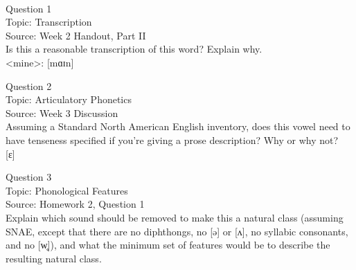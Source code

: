 \documentclass[12pt]{article}
\begin{document}
\newpage

\begin{center}
\textbf{{\color{red}{\HUGE END OF EXAM}}}\\

\end{center}
\newpage

\begin{center}
\textbf{{\color{blue}{\HUGE START OF EXAM\\}}}

\textbf{{\color{blue}{\HUGE Student ID: 23100\\}}}

\textbf{{\color{blue}{\HUGE \\}}}

\end{center}
\newpage

{\large Question 1}\\

Topic: Transcription\\
Source: Week 2 Handout, Part II\\

Is this a reasonable transcription of this word? Explain why.\\

<mine>: {[mɑɪn]}


\newpage

{\large Question 2}\\

Topic: Articulatory Phonetics\\
Source: Week 3 Discussion\\

Assuming a Standard North American English inventory, does this vowel need to have tenseness specified if you're giving a prose description? Why or why not?\\

{[ɛ]}


\newpage

{\large Question 3}\\

Topic: Phonological Features\\
Source: Homework 2, Question 1\\

Explain which sound should be removed to make this a natural class (assuming SNAE, except that there are no diphthongs, no [ə] or [ʌ], no syllabic consonants, and no [w̥]), and what the minimum set of features would be to describe the resulting natural class.\\
\end{document}
